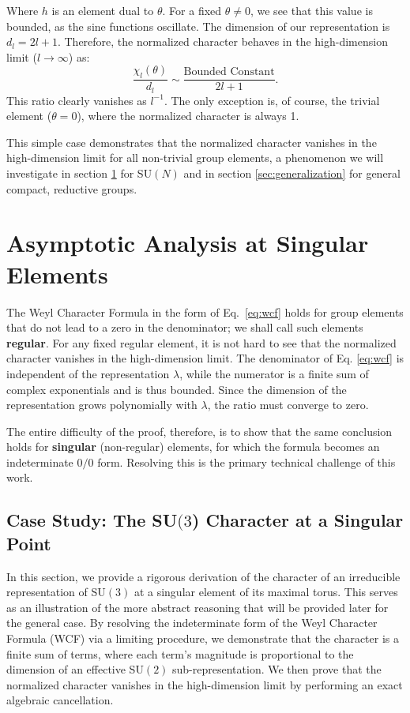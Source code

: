 \documentclass[11pt, a4paper]{article}
\theoremstyle{definition}
\theoremstyle{remark}
\begin{document}
Where $h$ is an element dual to $\theta$.
For a fixed $\theta \neq 0$, we see that this value is bounded, as the sine functions oscillate. The dimension of our representation is $d_l = 2l+1$. Therefore, the normalized character behaves in the high-dimension limit ($l \to \infty$) as:
\begin{equation}
    \frac{\chi_l(\theta)}{d_l} \sim \frac{\text{Bounded Constant}}{2l+1}.
\end{equation}
This ratio clearly vanishes as $l^{-1}$. The only exception is, of course, the trivial element ($\theta = 0$), where the normalized character is always 1.

This simple case demonstrates that the normalized character vanishes in the high-dimension limit for all non-trivial group elements, a phenomenon we will investigate in section \ref{sec:analysis} for SU$(N)$ and in section \ref{sec:generalization} for general compact, reductive groups.


\section{Asymptotic Analysis at Singular Elements}
\label{sec:analysis}

The Weyl Character Formula in the form of Eq.~\eqref{eq:wcf} holds for group elements that do not lead to a zero in the denominator; we shall call such elements \textbf{regular}. For any fixed regular element, it is not hard to see that the normalized character vanishes in the high-dimension limit. The denominator of Eq. \eqref{eq:wcf} is independent of the representation $\lambda$, while the numerator is a finite sum of complex exponentials and is thus bounded. Since the dimension of the representation grows polynomially with $\lambda$, the ratio must converge to zero.

The entire difficulty of the proof, therefore, is to show that the same conclusion holds for \textbf{singular} (non-regular) elements, for which the formula becomes an indeterminate $0/0$ form. Resolving this is the primary technical challenge of this work.


\subsection{Case Study: The SU$(3$) Character at a Singular Point}
\label{sec:su3_case_study}

In this section, we provide a rigorous derivation of the character of an irreducible representation of SU$(3)$ at a singular element of its maximal torus. This serves as an illustration of the more abstract reasoning that will be provided later for the general case. By resolving the indeterminate form of the Weyl Character Formula (WCF) via a limiting procedure, we demonstrate that the character is a finite sum of terms, where each term's magnitude is proportional to the dimension of an effective SU$(2)$ sub-representation. We then prove that the normalized character vanishes in the high-dimension limit by performing an exact algebraic cancellation.
\end{document}
